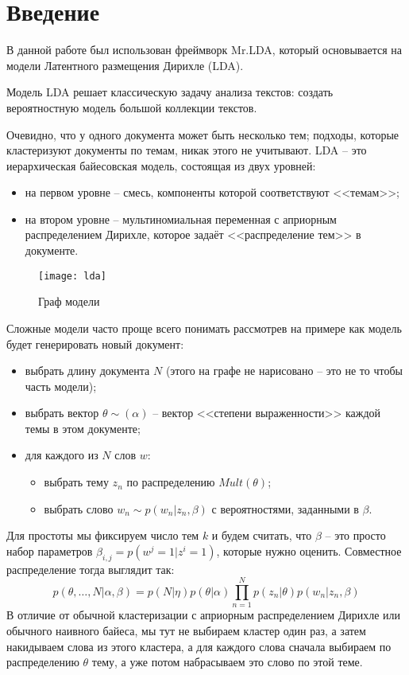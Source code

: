 \chapter{Введение}
В данной работе был использован фреймворк Mr.LDA\cite{mrlda}, который основывается на модели Латентного 
размещения Дирихле (LDA).

Модель LDA решает классическую задачу анализа текстов: создать вероятностную модель большой 
коллекции текстов.

Очевидно, что у одного документа может быть несколько тем; подходы, которые кластеризуют документы по 
темам, никак этого не учитывают. LDA -- это иерархическая байесовская модель, состоящая из двух уровней:
\begin{itemize}
    \item на первом уровне -- смесь, компоненты которой соответствуют <<темам>>;
    \item на втором уровне -- мультиномиальная переменная с априорным распределением Дирихле, 
        которое задаёт <<распределение тем>> в документе.
\end{itemize}

\begin{figure}
    \center
    \texttt{[image: lda]}
    \caption{Граф модели}
\end{figure}

Сложные модели часто проще всего понимать рассмотрев на примере как модель будет генерировать новый 
документ:
\begin{itemize}
    \item выбрать длину документа \( N \) (этого на графе не нарисовано -- это не то чтобы часть модели);
    \item выбрать вектор \( \theta \sim (\alpha) \) -- вектор <<степени выраженности>> каждой темы в 
        этом документе;
    \item для каждого из \( N \) слов \( w \):
    \begin{itemize}
        \item выбрать тему \( z_n \) по распределению \( Mult(\theta) \);
        \item выбрать слово \( w_n \sim p(w_n | z_n, \beta) \) с вероятностями, заданными в \( \beta \).
    \end{itemize}
\end{itemize}

Для простоты мы фиксируем число тем \( k \) и будем считать, что \( \beta \) -- это просто набор параметров
\( \beta_{i,j} = p(w^j = 1 | z^i = 1)\), которые нужно оценить. Совместное распределение тогда выглядит так:
\[
    p(\theta,\ldots,N|\alpha,\beta) = 
        p(N|\eta)p(\theta|\alpha)\prod\limits_{n=1}^{N}p(z_n|\theta)p(w_n|z_n,\beta)
\]
В отличие от обычной кластеризации с априорным распределением Дирихле или обычного наивного байеса, мы 
тут не выбираем кластер один раз, а затем накидываем слова из этого кластера, а для каждого слова 
сначала выбираем по распределению \( \theta \) тему, а уже потом набрасываем это слово по этой теме.

